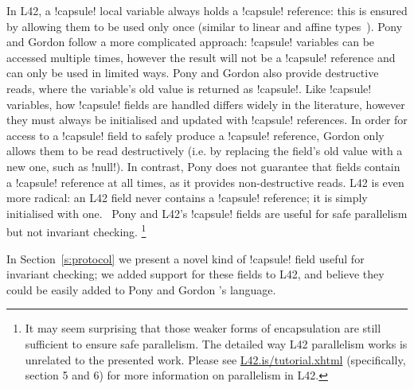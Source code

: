 In L42, a \Q!capsule! local variable always holds a \Q!capsule! reference: this is ensured by allowing them to be used only once (similar to linear and affine types~\cite{boyland2001alias}). 
Pony and Gordon \etal follow a more complicated approach: \Q!capsule! variables can be accessed multiple times, however the result will not be a \Q!capsule! reference and can only be used in limited ways. Pony and Gordon also provide destructive reads, where the variable's old value is returned as \Q!capsule!.
Like \Q!capsule! variables, how \Q!capsule! fields are handled differs widely in the literature, however they must always be initialised and updated with \Q!capsule! references. In order for access to a \Q!capsule! field to safely produce a \Q!capsule! reference, Gordon \etal only allows them to be read destructively (i.e. by replacing the field's old value with a new one, such as \Q!null!). 
In contrast, 
Pony does not guarantee that \Q@capsule@ fields contain a \Q!capsule! reference at all times, as it provides non-destructive reads.
L42 is even more radical: an L42 \Q@capsule@ field never contains a \Q!capsule! reference; it is simply initialised with one.~\cite{ServettoEtAl13a,GIANNINI2019145}
Pony and L42's \Q!capsule! fields
 are useful for safe parallelism but not invariant checking. \footnote{It may seem surprising that 
those weaker forms of encapsulation are still sufficient to ensure safe parallelism. 
The detailed way L42 parallelism works is unrelated to the presented work.
Please see \url{L42.is/tutorial.xhtml} (specifically, section 5 and 6) for more information on parallelism in L42.
}

In Section~\ref{s:protocol} we present a novel kind of \Q!capsule! field 
useful for invariant checking;
 we added support for these fields to L42, and believe they could be easily added to Pony and Gordon \etal's language.

